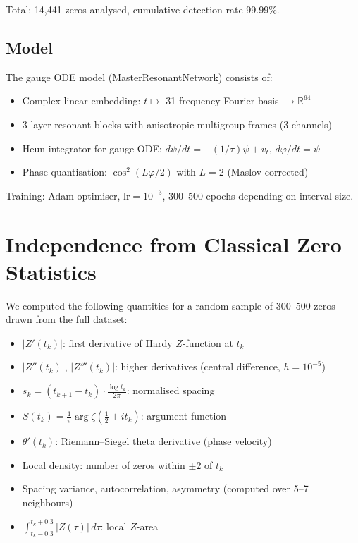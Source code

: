 \documentclass[11pt,a4paper]{article}
\newcommand{\R}{\mathbb{R}}
\begin{document}
Total: 14{,}441 zeros analysed, cumulative detection rate 99.99\%.

\subsection{Model}

The gauge ODE model (MasterResonantNetwork) consists of:
\begin{itemize}
  \item Complex linear embedding: $t \mapsto$ 31-frequency Fourier basis $\to \R^{64}$
  \item 3-layer resonant blocks with anisotropic multigroup frames (3 channels)
  \item Heun integrator for gauge ODE: $d\psi/dt = -(1/\tau)\psi + v_t$, $d\varphi/dt = \psi$
  \item Phase quantisation: $\cos^2(L\varphi/2)$ with $L=2$ (Maslov-corrected)
\end{itemize}

Training: Adam optimiser, $\text{lr}=10^{-3}$, 300--500 epochs depending on interval size.

\section{Independence from Classical Zero Statistics}

We computed the following quantities for a random sample of 300--500 zeros
drawn from the full dataset:

\begin{itemize}
  \item $|Z'(t_k)|$: first derivative of Hardy $Z$-function at $t_k$
  \item $|Z''(t_k)|$, $|Z'''(t_k)|$: higher derivatives (central difference, $h = 10^{-5}$)
  \item $s_k = (t_{k+1} - t_k) \cdot \frac{\log t_k}{2\pi}$: normalised spacing
  \item $S(t_k) = \frac{1}{\pi}\arg\zeta(\tfrac{1}{2}+it_k)$: argument function
  \item $\theta'(t_k)$: Riemann--Siegel theta derivative (phase velocity)
  \item Local density: number of zeros within $\pm 2$ of $t_k$
  \item Spacing variance, autocorrelation, asymmetry (computed over 5--7 neighbours)
  \item $\int_{t_k - 0.3}^{t_k + 0.3} |Z(\tau)|\,d\tau$: local $Z$-area
\end{itemize}
\end{document}
